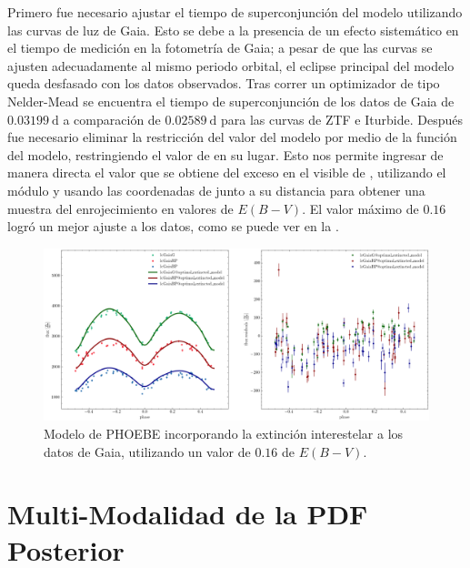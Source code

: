 Primero fue necesario ajustar el tiempo de superconjunción del modelo utilizando
las curvas de luz de Gaia. Esto se debe a la presencia de un efecto sistemático
en el tiempo de medición en la fotometría de Gaia; a pesar de que las curvas se
ajusten adecuadamente al mismo periodo orbital, el eclipse principal del modelo
queda desfasado con los datos observados. Tras correr un optimizador de tipo
Nelder-Mead se encuentra el tiempo de superconjunción de los datos de Gaia de
$0.03199 \ \mathrm{d}$ a comparación de $0.02589 \ \mathrm{d}$ para las curvas
de ZTF e Iturbide. Después fue necesario eliminar la restricción del valor
 del modelo por medio de la función  del
modelo, restringiendo el valor de  en su lugar. Esto nos permite
ingresar de manera directa el valor que se obtiene del exceso en el visible de
, utilizando el módulo  y usando las
coordenadas de \atoObjId junto a su distancia para obtener una muestra del
enrojecimiento en valores de $E(B-V)$. El valor máximo de $0.16$ logró un mejor
ajuste a los datos, como se puede ver en la
.

\begin{figure}[!ht]
    \centering
    \includegraphics[scale=0.45]{Conclusion/Figures/Figura Phoebe Gaia Extinguido.png}
    \caption{Modelo de PHOEBE incorporando la extinción interestelar a los datos
    de Gaia, utilizando un valor de $0.16$ de $E(B-V)$.}
    \label{figuraPhoebeGaiaExtinguido}
\end{figure}

\section{Multi-Modalidad de la PDF Posterior} \label{conclusion:consideraciones_phoebe:multimodalidad_pdf}

